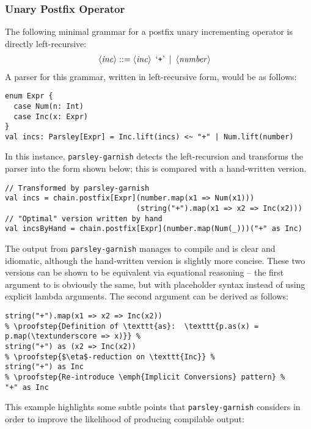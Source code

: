 \documentclass[../../main.tex]{subfiles}
\begin{document}
\subsubsection{Unary Postfix Operator}
The following minimal grammar for a postfix unary incrementing operator is directly left-recursive:
\begin{align*}
\langle \mathit{inc} \rangle &::= \langle \mathit{inc} \rangle \enspace \text{`\texttt{+}'} \enspace | \enspace \langle \mathit{number} \rangle
\end{align*}
%
A parser for this grammar, written in left-recursive form, would be as follows:
\begin{verbatim}
enum Expr {
  case Num(n: Int)
  case Inc(x: Expr)
}
val incs: Parsley[Expr] = Inc.lift(incs) <~ "+" | Num.lift(number)
\end{verbatim}
%
In this instance, \texttt{parsley-garnish} detects the left-recursion and transforms the parser into the form shown below; this is compared with a hand-written version.
\begin{verbatim}
// Transformed by parsley-garnish
val incs = chain.postfix[Expr](number.map(x1 => Num(x1)))
                              (string("+").map(x1 => x2 => Inc(x2)))
// "Optimal" version written by hand
val incsByHand = chain.postfix[Expr](number.map(Num(_)))("+" as Inc)
\end{verbatim}
%
The output from \texttt{parsley-garnish} manages to compile and is clear and idiomatic, although the hand-written version is slightly more concise.
These two versions can be shown to be equivalent via equational reasoning --
the first argument to  is obviously the same, but with placeholder syntax instead of using explicit lambda arguments.
The second argument can be derived as follows:
\begin{verbatim}
string("+").map(x1 => x2 => Inc(x2))
% \proofstep{Definition of \texttt{as}:  \texttt{p.as(x) = p.map(\textunderscore => x)}} %
string("+") as (x2 => Inc(x2))
% \proofstep{$\eta$-reduction on \texttt{Inc}} %
string("+") as Inc
% \proofstep{Re-introduce \emph{Implicit Conversions} pattern} %
"+" as Inc
\end{verbatim}
%
This example highlights some subtle points that \texttt{parsley-garnish} considers in order to improve the likelihood of producing compilable output:
\end{document}
